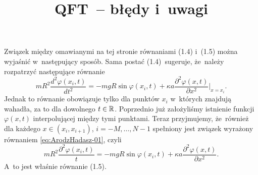 \documentclass[a4paper,11pt]{article}
\title{QFT~-- błędy i~uwagi}
\begin{document}





\maketitle %









\start {} Związek między omawianymi na tej stronie równaniami
(1.4) i~(1.5) można wyjaśnić w~następujący sposób. Sama postać
(1.4)~sugeruje, że~należy rozpatrzyć następujące równanie
\begin{equation}
  \label{eq:ArodzHadasz-01}
  m R^{ 2 } \frac{ d^{ 2 } \varphi( x_{ i }, t ) }{ dt^{ 2 } } =
  -m g R \sin \varphi( x_{ i }, t )
  + \kappa a \frac{ \partial^{ 2 } \varphi( x, t ) }{ \partial x^{ 2 } }\bigg|_{ x = x_{ i } }.
\end{equation}
Jednak to równanie obowiązuje tylko dla punktów $x_{ i }$ w~których
znajdują wahadła, za to dla dowolnego $t \in \mathbb{R}$. Poprzednio już
założyliśmy istnienie funkcji $\varphi( x , t )$ interpolującej między
tymi punktami. Teraz przyjmujemy, że~również dla każdego
$x \in ( x_{ i }, x_{ i + 1 } )$, $i = -M, \ldots, N - 1$ spełniony jest
związek wyrażony równaniem \eqref{eq:ArodzHadasz-01}, czyli
\begin{equation}
  \label{eq:ArodzHadasz-02}
  m R^{ 2 } \frac{ \partial^{ 2 } \varphi( x_{ i }, t ) }{ t } =
  -m g R \sin \varphi( x_{ i }, t )
  + \kappa a \frac{ \partial^{ 2 } \varphi( x, t ) }{ \partial x^{ 2 } }.
\end{equation}
A~to jest właśnie równanie (1.5).


\end{document}

